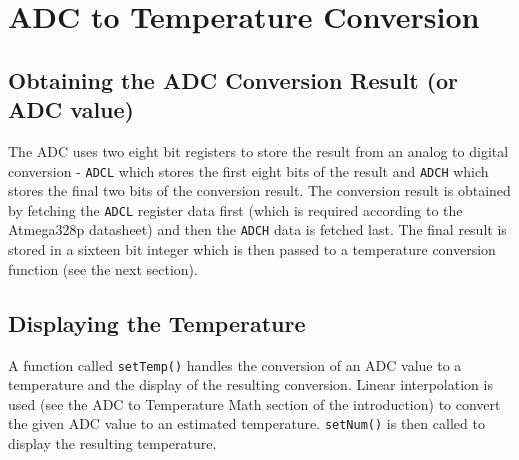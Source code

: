 \documentclass[main.tex]{subfiles}
\begin{document}
	\section{ADC to Temperature Conversion}
		\subsection{Obtaining the ADC Conversion Result (or ADC value)}
		The ADC uses two eight bit registers to store the result from an analog to
		digital conversion - \lstinline{ADCL} which stores the first eight bits of
		the result and \lstinline{ADCH} which stores the final two bits of the
		conversion result. The conversion result is obtained by fetching the
		\lstinline{ADCL} register data first (which is required according to the
		Atmega328p datasheet) and then the \lstinline{ADCH} data is fetched last.
		The final result is stored in a sixteen bit integer which is then passed to
		a temperature conversion function (see the next section). 

		\subsection{Displaying the Temperature}
		A function called \lstinline{setTemp()} handles the conversion of an ADC
		value to a temperature and the display of the resulting conversion. Linear
		interpolation is used (see the ADC to Temperature Math section of the
		introduction) to convert the given ADC value to an estimated temperature.
		\lstinline{setNum()} is then called to display the resulting temperature.
\end{document}

